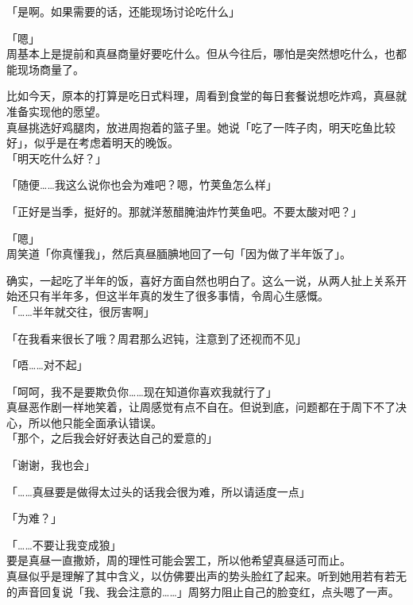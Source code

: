 「是啊。如果需要的话，还能现场讨论吃什么」

「嗯」\\

周基本上是提前和真昼商量好要吃什么。但从今往后，哪怕是突然想吃什么，也都能现场商量了。

比如今天，原本的打算是吃日式料理，周看到食堂的每日套餐说想吃炸鸡，真昼就准备实现他的愿望。\\

真昼挑选好鸡腿肉，放进周抱着的篮子里。她说「吃了一阵子肉，明天吃鱼比较好」，似乎是在考虑着明天的晚饭。\\

「明天吃什么好？」

「随便……我这么说你也会为难吧？嗯，竹荚鱼怎么样」

「正好是当季，挺好的。那就洋葱醋腌油炸竹荚鱼吧。不要太酸对吧？」

「嗯」\\

周笑道「你真懂我」，然后真昼腼腆地回了一句「因为做了半年饭了」。

确实，一起吃了半年的饭，喜好方面自然也明白了。这么一说，从两人扯上关系开始还只有半年多，但这半年真的发生了很多事情，令周心生感慨。\\

「……半年就交往，很厉害啊」

「在我看来很长了哦？周君那么迟钝，注意到了还视而不见」

「唔……对不起」

「呵呵，我不是要欺负你……现在知道你喜欢我就行了」\\

真昼恶作剧一样地笑着，让周感觉有点不自在。但说到底，问题都在于周下不了决心，所以他只能全面承认错误。\\

「那个，之后我会好好表达自己的爱意的」

「谢谢，我也会」

「……真昼要是做得太过头的话我会很为难，所以请适度一点」

「为难？」

「……不要让我变成狼」\\

要是真昼一直撒娇，周的理性可能会罢工，所以他希望真昼适可而止。\\

真昼似乎是理解了其中含义，以仿佛要出声的势头脸红了起来。听到她用若有若无的声音回复说「我、我会注意的……」周努力阻止自己的脸变红，点头嗯了一声。
